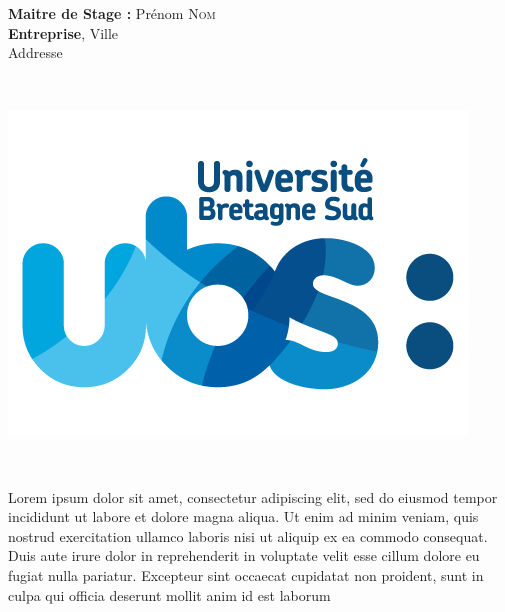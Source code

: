 \documentclass[french]{report}
\begin{document}
\begin{titlepage}
    \begin{minipage}{0.6\textwidth}
        \begin{flushleft}
            \large{\textbf{Maitre de Stage :} Prénom \textsc{Nom} \\
            \textbf{Entreprise},  Ville   \\ Addresse
            }
        \end{flushleft}
    \end{minipage}
    ~
    \begin{minipage}{0.4\textwidth}
        \begin{flushright} \large
            \includegraphics[scale=0.25]{Images/UBS-LOGO-RVB-Fd-Transparent.png}
        \end{flushright}
    \end{minipage}\\
   
    \end{titlepage}


\vspace*{25px}

Lorem ipsum dolor sit amet, consectetur adipiscing elit, sed do eiusmod tempor incididunt ut labore et dolore magna aliqua. Ut enim ad minim veniam, quis nostrud exercitation ullamco laboris nisi ut aliquip ex ea commodo consequat. Duis aute irure dolor in reprehenderit in voluptate velit esse cillum dolore eu fugiat nulla pariatur. Excepteur sint occaecat cupidatat non proident, sunt in culpa qui officia deserunt mollit anim id est laborum
\end{document}
